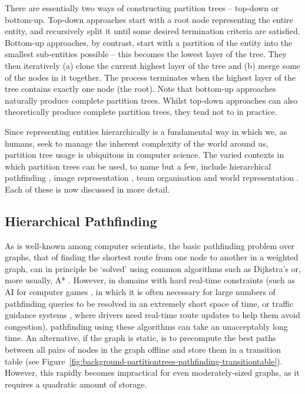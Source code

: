 There are essentially two ways of constructing partition trees -- top-down or bottom-up. Top-down approaches start with a root node representing the entire entity, and recursively split it until some desired termination criteria are satisfied. Bottom-up approaches, by contrast, start with a partition of the entity into the smallest sub-entities possible -- this becomes the lowest layer of the tree. They then iteratively (a) clone the current highest layer of the tree and (b) merge some of the nodes in it together. The process terminates when the highest layer of the tree contains exactly one node (the root). Note that bottom-up approaches naturally produce complete partition trees. Whilst top-down approaches can also theoretically produce complete partition trees, they tend not to in practice.

\enlargethispage*{\baselineskip}

Since representing entities hierarchically is a fundamental way in which we, as humans, seek to manage the inherent complexity of the world around us, partition tree usage is ubiquitous in computer science. The varied contexts in which partition trees can be used, to name but a few, include hierarchical pathfinding \cite{kim98}, image representation \cite{al-haj08,andrade03,salembier00}, team organisation \cite{?} and world representation \cite{finkel74,fuchs80}. Each of these is now discussed in more detail.

\subsection{Hierarchical Pathfinding}

As is well-known among computer scientists, the basic pathfinding problem over graphs, that of finding the shortest route from one node to another in a weighted graph, can in principle be `solved' using common algorithms such as Dijkstra's or, more usually, A* \cite{aima}. However, in domains with hard real-time constraints (such as AI for computer games \cite{dickheiser04,vandersterren04}, in which it is often necessary for large numbers of pathfinding queries to be resolved in an extremely short space of time, or traffic guidance systems \cite{jing96,jung96,kim98}, where drivers need real-time route updates to help them avoid congestion), pathfinding using these algorithms can take an unacceptably long time. An alternative, if the graph is static, is to precompute the best paths between all pairs of nodes in the graph offline and store them in a transition table (see Figure~\ref{fig:background-partitiontrees-pathfinding-transitiontable}). However, this rapidly becomes impractical for even moderately-sized graphs, as it requires a quadratic amount of storage.


